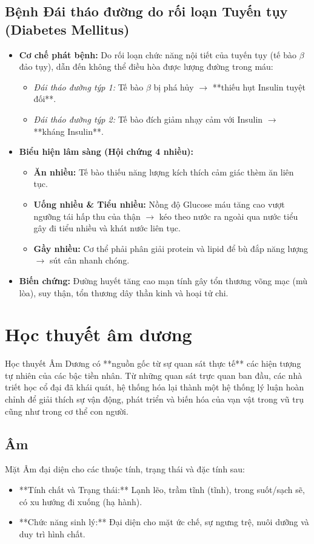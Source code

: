 \subsection{Bệnh Đái tháo đường do rối loạn Tuyến tụy (Diabetes Mellitus)}
\begin{itemize}
    \item \textbf{Cơ chế phát bệnh:} Do rối loạn chức năng nội tiết của tuyến tụy (tế bào $\beta$ đảo tụy), dẫn đến không thể điều hòa được lượng đường trong máu:
    \begin{itemize}
        \item \textit{Đái tháo đường týp 1:} Tế bào $\beta$ bị phá hủy $\rightarrow$ **thiếu hụt Insulin tuyệt đối**.
        \item \textit{Đái tháo đường týp 2:} Tế bào đích giảm nhạy cảm với Insulin $\rightarrow$ **kháng Insulin**.
    \end{itemize}
    \item \textbf{Biểu hiện lâm sàng (Hội chứng 4 nhiều):}
    \begin{itemize}
        \item \textbf{Ăn nhiều:} Tế bào thiếu năng lượng kích thích cảm giác thèm ăn liên tục.
        \item \textbf{Uống nhiều \& Tiểu nhiều:} Nồng độ Glucose máu tăng cao vượt ngưỡng tái hấp thu của thận $\rightarrow$ kéo theo nước ra ngoài qua nước tiểu gây đi tiểu nhiều và khát nước liên tục.
        \item \textbf{Gầy nhiều:} Cơ thể phải phân giải protein và lipid để bù đắp năng lượng $\rightarrow$ sút cân nhanh chóng.
    \end{itemize}
    \item \textbf{Biến chứng:} Đường huyết tăng cao mạn tính gây tổn thương võng mạc (mù lòa), suy thận, tổn thương dây thần kinh và hoại tử chi.
\end{itemize}

\section{Học thuyết âm dương}

Học thuyết Âm Dương có **nguồn gốc từ sự quan sát thực tế** các hiện tượng tự nhiên của các bậc tiền nhân. Từ những quan sát trực quan ban đầu, các nhà triết học cổ đại đã khái quát, hệ thống hóa lại thành một hệ thống lý luận hoàn chỉnh để giải thích sự vận động, phát triển và biến hóa của vạn vật trong vũ trụ cũng như trong cơ thể con người.

\subsection{Âm}
Mặt Âm đại diện cho các thuộc tính, trạng thái và đặc tính sau:
\begin{itemize}
    \item **Tính chất và Trạng thái:** Lạnh lẽo, trầm tĩnh (tĩnh), trong suốt/sạch sẽ, có xu hướng đi xuống (hạ hành).
    \item **Chức năng sinh lý:** Đại diện cho mặt ức chế, sự ngưng trệ, nuôi dưỡng và duy trì hình chất.
\end{itemize}

